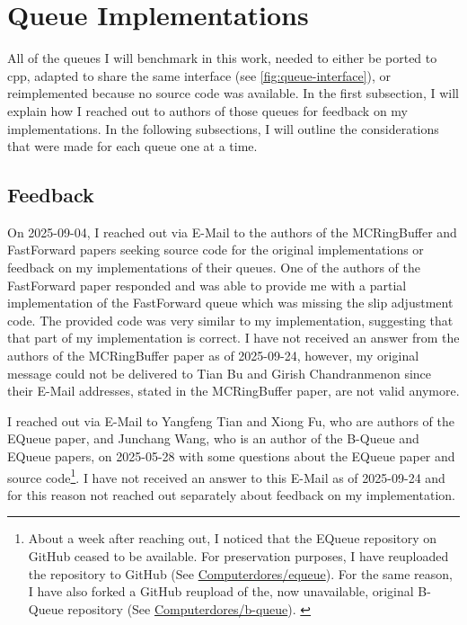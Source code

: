 \section{Queue Implementations}
All of the queues I will benchmark in this work, needed to either be ported to cpp, adapted to share the same
interface (see \autoref{fig:queue-interface}), or reimplemented because no source code was available.
In the first subsection, I will explain how I reached out to authors of those queues for feedback on my implementations.
In the following subsections, I will outline the considerations that were made for each queue one at a time.

\subsection{Feedback}
On 2025-09-04, I reached out via E-Mail to the authors of the MCRingBuffer and FastForward papers seeking
source code for the original implementations or feedback on my implementations of their queues.
One of the authors of the FastForward paper responded and was able to provide me with a partial
implementation of the FastForward queue which was missing the slip adjustment code.
The provided code was very similar to my implementation, suggesting that that part of my implementation is correct.
I have not received an answer from the authors of the MCRingBuffer paper as of 2025-09-24, however, my
original message could not be delivered to Tian Bu and Girish Chandranmenon since their E-Mail addresses,
stated in the MCRingBuffer paper, are not valid anymore.

I reached out via E-Mail to Yangfeng Tian and Xiong Fu, who are authors of the EQueue paper, and Junchang
Wang, who is an author of the B-Queue and EQueue papers, on 2025-05-28 with some questions about the EQueue
paper and source code\footnote{About a week after reaching out,
    I noticed that the EQueue repository on GitHub ceased to be available.
    For preservation purposes, I have reuploaded the repository to GitHub (See
    \href{https://github.com/Computerdores/equeue}{Computerdores/equeue}).
    For the same reason, I have also forked a GitHub reupload of the, now unavailable, original B-Queue
    repository (See \href{https://github.com/Computerdores/b-queue}{Computerdores/b-queue}).
\label{equeue-bqueue-links}}.
I have not received an answer to this E-Mail as of 2025-09-24 and for this reason not reached out separately
about feedback on my implementation.

